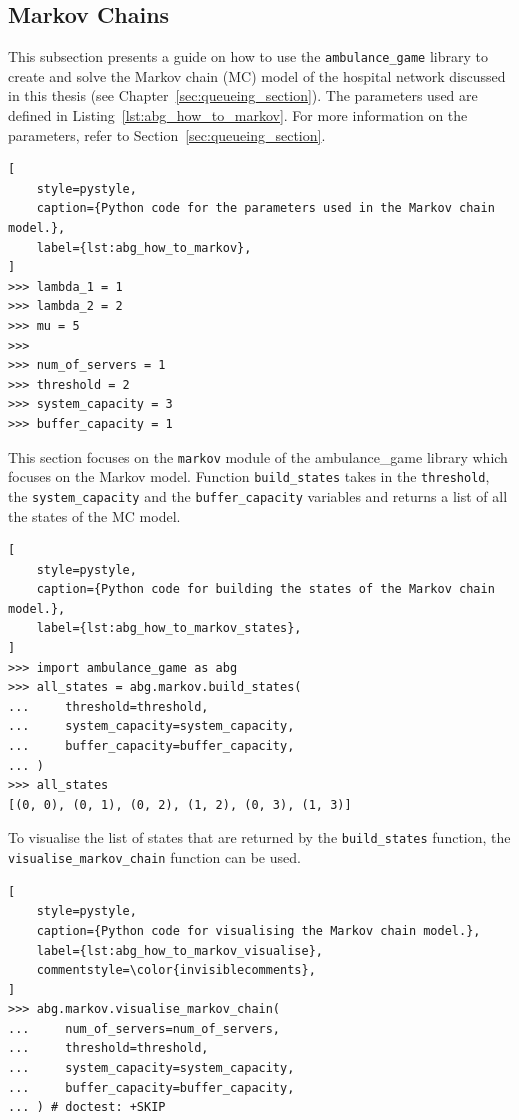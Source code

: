 \subsection{Markov Chains}

This subsection presents a guide on how to use the \texttt{ambulance\_game}
library to create and solve the Markov chain (MC) model of the hospital network
discussed in this thesis (see Chapter~\ref{sec:queueing_section}).
The parameters used are defined in Listing~\ref{lst:abg_how_to_markov}.
For more information on the parameters, refer to
Section~\ref{sec:queueing_section}.


\begin{lstlisting}[
    style=pystyle,
    caption={Python code for the parameters used in the Markov chain model.},
    label={lst:abg_how_to_markov},
]
>>> lambda_1 = 1
>>> lambda_2 = 2
>>> mu = 5
>>>
>>> num_of_servers = 1
>>> threshold = 2
>>> system_capacity = 3
>>> buffer_capacity = 1

\end{lstlisting}

This section focuses on the \texttt{markov} module of the ambulance\_game
library which focuses on the Markov model.
Function \texttt{build\_states} takes in the \texttt{threshold}, the
\texttt{system\_capacity} and the \texttt{buffer\_capacity} variables and
returns a list of all the states of the MC model.

\begin{lstlisting}[
    style=pystyle,
    caption={Python code for building the states of the Markov chain model.},
    label={lst:abg_how_to_markov_states},
]
>>> import ambulance_game as abg
>>> all_states = abg.markov.build_states(
...     threshold=threshold,
...     system_capacity=system_capacity,
...     buffer_capacity=buffer_capacity,
... )
>>> all_states
[(0, 0), (0, 1), (0, 2), (1, 2), (0, 3), (1, 3)]

\end{lstlisting}

To visualise the list of states that are returned by the
\texttt{build\_states} function, the \texttt{visualise\_markov\_chain}
function can be used.

\begin{lstlisting}[
    style=pystyle,
    caption={Python code for visualising the Markov chain model.},
    label={lst:abg_how_to_markov_visualise},
    commentstyle=\color{invisiblecomments},
]
>>> abg.markov.visualise_markov_chain(
...     num_of_servers=num_of_servers,
...     threshold=threshold,
...     system_capacity=system_capacity,
...     buffer_capacity=buffer_capacity,
... ) # doctest: +SKIP
\end{lstlisting}


